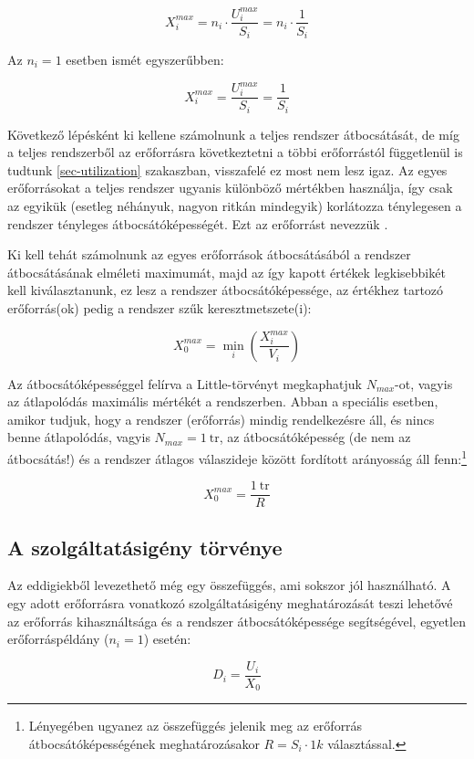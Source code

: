 $$X_i^{max} = n_i \cdot \frac{U_i^{max}}{S_i} = n_i \cdot \frac{1}{S_i}$$

Az $n_i=1$ esetben ismét egyszerűbben:

$$X_i^{max} = \frac{U_i^{max}}{S_i} = \frac{1}{S_i}$$

Következő lépésként ki kellene számolnunk a teljes rendszer átbocsátását, de míg a teljes rendszerből az erőforrásra következtetni a többi erőforrástól függetlenül is tudtunk \az\autoref{sec-utilization} szakaszban, visszafelé ez most nem lesz igaz. Az egyes erőforrásokat a teljes rendszer ugyanis különböző mértékben használja, így csak az egyikük (esetleg néhányuk, nagyon ritkán mindegyik) korlátozza ténylegesen a rendszer tényleges átbocsátóképességét. Ezt az erőforrást nevezzük .

Ki kell tehát számolnunk az egyes erőforrások átbocsátásából a rendszer átbocsátásának elméleti maximumát, majd az így kapott értékek legkisebbikét kell kiválasztanunk, ez lesz a rendszer átbocsátóképessége, az értékhez tartozó erőforrás(ok) pedig a rendszer szűk keresztmetszete(i):

$$X_0^{max} = \min_i\left(\frac{X_i^{max}}{V_i}\right)$$

Az átbocsátóképességgel felírva a Little-törvényt megkaphatjuk $N_{max}$-ot, vagyis az átlapolódás maximális mértékét a rendszerben. Abban a speciális esetben, amikor tudjuk, hogy a rendszer (erőforrás) mindig rendelkezésre áll, és nincs benne átlapolódás, vagyis $N_{max} = 1~\mathrm{tr}$, az átbocsátóképesség (de nem az átbocsátás!) és a rendszer átlagos válaszideje között fordított arányosság áll fenn:\footnote{Lényegében ugyanez az összefüggés jelenik meg az erőforrás átbocsátóképességének meghatározásakor $R = S_i \cdot 1k$ választással.}

$$X_0^{max} = \frac{1~\mathrm{tr}}{R}$$

\subsection{A szolgáltatásigény törvénye}

Az eddigiekből levezethető még egy összefüggés, ami sokszor jól használható. A  egy adott erőforrásra vonatkozó szolgáltatásigény meghatározását teszi lehetővé az erőforrás kihasználtsága és a rendszer átbocsátóképessége segítségével, egyetlen erőforráspéldány ($n_i = 1$) esetén:

$$D_i = \frac{U_i}{X_0}$$

